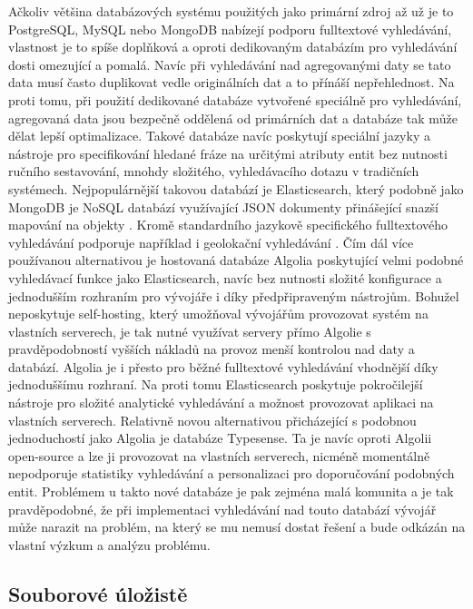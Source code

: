 \begin{itemize}
\begin{itemize}
		Ačkoliv většina databázových systému použitých jako primární zdroj až už je to PostgreSQL, MySQL nebo MongoDB
		nabízejí podporu fulltextové vyhledávání, vlastnost je to spíše doplňková a oproti dedikovaným databázím
		pro vyhledávání dosti omezující a pomalá.
		Navíc při vyhledávání nad agregovanými daty se tato data musí často duplikovat vedle originálních dat a to přínáší
		nepřehlednost.
		Na proti tomu, při použití dedikované databáze vytvořené speciálně pro vyhledávání, agregovaná data jsou bezpečně
		oddělená od primárních dat a databáze tak může dělat lepší optimalizace.
		Takové databáze navíc poskytují speciální jazyky a nástroje pro specifikování hledané fráze na určitými atributy
		entit bez nutnosti ručního sestavování, mnohdy složitého, vyhledávacího dotazu v tradičních systémech.
		Nejpopulárnější takovou databází je Elasticsearch, který podobně jako MongoDB je \Ac{NoSQL} databází
		využívající \Ac{JSON} dokumenty přinášející snazší mapování na objekty \cite{es_documents}.
		Kromě standardního jazykově specifického fulltextového vyhledávání podporuje například i geolokační vyhledávání
		\cite{es_documents}.
		Čím dál více používanou alternativou je hostovaná databáze Algolia poskytující velmi podobné vyhledávací
		funkce jako Elasticsearch, navíc bez nutnosti složité konfigurace a jednodušším rozhraním pro vývojáře i díky
		předpřipraveným nástrojům.
		Bohužel neposkytuje self-hosting, který umožňoval vývojářům provozovat systém na vlastních serverech, je tak
		nutné využívat servery přímo Algolie s pravděpodobností vyšších nákladů na provoz menší kontrolou nad daty a
		databází.
		Algolia je i přesto pro běžné fulltextové vyhledávání vhodnější díky jednoduššímu rozhraní.
		Na proti tomu Elasticsearch poskytuje pokročilejší nástroje pro složité analytické vyhledávání a možnost
		provozovat aplikaci na vlastních serverech.\cite{es_vs_algolia}
		Relativně novou alternativou přicházející s podobnou jednoduchostí jako Algolia je databáze Typesense.
		Ta je navíc oproti Algolii open-source a lze ji provozovat na vlastních serverech, nicméně momentálně nepodporuje
		statistiky vyhledávání a personalizaci pro doporučování podobných entit.\cite{typesence}
		Problémem u takto nové databáze je pak zejména malá komunita a je tak pravděpodobné, že při implementaci vyhledávání
		nad touto databází vývojář může narazit na problém, na který se mu nemusí dostat řešení a bude odkázán na vlastní
		výzkum a analýzu problému.

	\subsection{Souborové úložistě}


\end{itemize}
\end{itemize}

